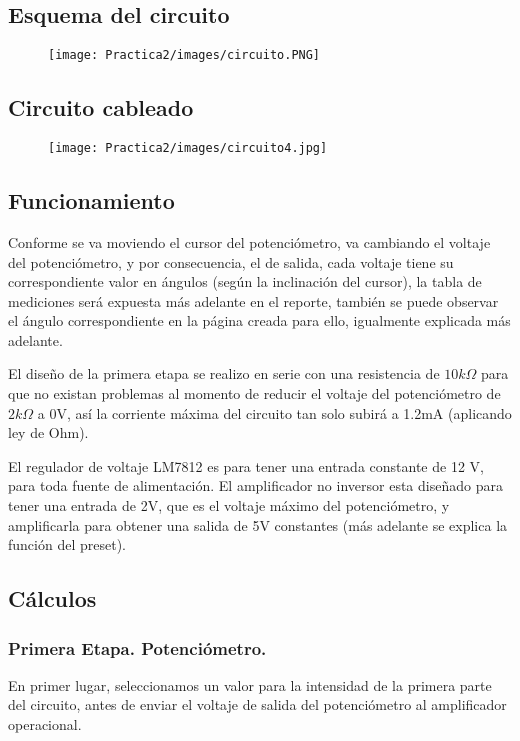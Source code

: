 \documentclass[12pt]{article}
\begin{document}
		\subsection{Esquema del circuito}
		\begin{figure}[h!]
                \centering
                \texttt{[image: Practica2/images/circuito.PNG]}
            \end{figure} 
        
        \subsection{Circuito cableado}
        \begin{figure}[h!]
                \centering
                \texttt{[image: Practica2/images/circuito4.jpg]}
            \end{figure} 
        \newpage
		\subsection{Funcionamiento}
        Conforme se va moviendo el cursor del potenciómetro, va cambiando el voltaje del potenciómetro, y por consecuencia, el de salida, cada voltaje tiene su correspondiente valor en ángulos (según la inclinación del cursor), la tabla de mediciones será expuesta más adelante en el reporte, también se puede observar el ángulo correspondiente en la página creada para ello, igualmente explicada más adelante. 
        
        El diseño de la primera etapa se realizo en serie con una resistencia de $10k\Omega$ para que no existan problemas al momento de reducir el voltaje del potenciómetro de $2k\Omega$ a 0V, así la corriente máxima del circuito tan solo subirá a 1.2mA (aplicando ley de Ohm).
        
        El regulador de voltaje LM7812 es para tener una entrada constante de 12 V, para toda fuente de alimentación. El amplificador no inversor esta diseñado para tener una entrada de 2V, que es el voltaje máximo del potenciómetro, y amplificarla para obtener una salida de 5V constantes (más adelante se explica la función del preset).
		\subsection{Cálculos}
        \subsubsection{Primera Etapa. Potenciómetro.}
        En primer lugar, seleccionamos un valor para la intensidad de la primera parte del circuito, antes de enviar el voltaje de salida del potenciómetro al amplificador operacional.
        
\end{document}
